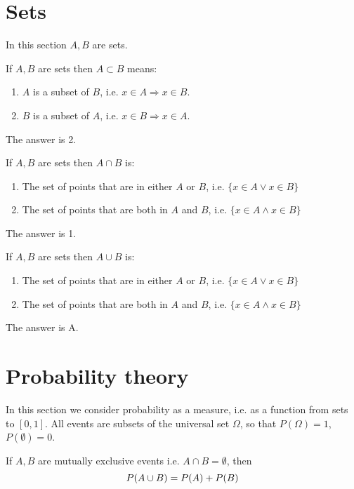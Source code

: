 \documentclass[a4paper]{article}
\def\solution {1}
\begin{document}
\section{Sets}
In this section $A, B$ are sets.

\begin{exercise}
  If $A, B$ are sets then
  $A \subset B$ means:
  \begin{enumerate}
  \item $A$ is a subset of $B$, i.e. $x \in A \Rightarrow x \in B$.
  \item $B$ is a subset of $A$, i.e. $x \in B \Rightarrow x \in A$.
  \end{enumerate}
\end{exercise}
\ifdefined \solution
The answer is 2.
\fi

\begin{exercise}
  If $A, B$ are sets then
  $A \cap B$ is:
  \begin{enumerate}
  \item The set of points that are in either $A$ or $B$, i.e. $\{x \in A \vee x \in B\}$
  \item The set of points that are both in $A$ and $B$, i.e. $\{x \in A \wedge x \in B\}$ 
  \end{enumerate}
\end{exercise}
\ifdefined \solution
The answer is 1.
\fi

\begin{exercise}
  If $A, B$ are sets then
  $A \cup B$ is:
  \begin{enumerate}
  \item The set of points that are in either $A$ or $B$, i.e. $\{x \in A \vee x \in B\}$
  \item The set of points that are both in $A$ and $B$, i.e. $\{x \in A \wedge x \in B\}$ 
  \end{enumerate}
\end{exercise}
\ifdefined \solution
The answer is A.
\fi


\section{Probability theory}
In this section we consider probability as a measure, i.e. as a function from sets to $[0,1]$. All events are subsets of the universal set $\Omega$, so that $P(\Omega) = 1$, $P(\emptyset) = 0$.
\begin{exercise}
  If $A, B$ are mutually exclusive events i.e. $A \cap B = \emptyset$,  then 
  \[
  P(A \cup B) =
  \ifdefined \solution
  P(A) + P(B)
  \else
  \ldots
  \fi
  \]
\end{exercise}
\end{document}
